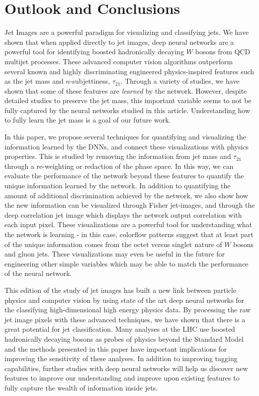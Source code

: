 \section{Outlook and Conclusions}
\label{sec:conclusion}
Jet Images are a powerful paradigm for visualizing and classifying jets.  We have shown that when applied directly to jet images, deep neural networks are a powerful tool for identifying boosted hadronically decaying $W$ bosons from QCD multijet processes.  These advanced computer vision algorithms outperform several known and highly discriminating engineered physics-inspired features such as the jet mass and $n$-subjettiness, $\tau_{21}$.  Through a variety of studies, we have shown that some of these features are {\it learned} by the network.  However, despite detailed studies to preserve the jet mass, this important variable seems to not be fully captured by the neural networks studied in this article.  Understanding how to fully learn the jet mass is a goal of our future work.

In this paper, we propose several techniques for quantifying and visualizing the information learned by the DNNs, and connect these visualizations with physics properties.  This is studied by removing the information from jet mass and $\tau_{21}$ through a re-weighting or redaction of the phase space.  In this way, we can evaluate the performance of the network beyond these features to quantify the unique information learned by the network.  In addition to quantifying the amount of additional discrimination achieved by the network, we also show how the new information can be visualized through Fisher jet-images, and through the deep correlation jet image which displays the network output correlation with each input pixel.  These visualizations are a powerful tool for understanding what the network is learning - in this case, colorflow patterns suggest that at least part of the unique information comes from the octet versus singlet nature of $W$ bosons and gluon jets.  These visualizations may even be useful in the future for engineering other simple variables which may be able to match the performance of the neural network.  

This edition of the study of jet images has built a new link between particle physics and computer vision by using state of the art deep neural networks for the classifying high-dimensional high energy physics data.  By processing the raw jet image pixels with these advanced techniques, we have shown that there is a great potential for jet classification.  Many analyses at the LHC use boosted hadronically decaying bosons as probes of physics beyond the Standard Model and the methods presented in this paper have important implications for improving the sensitivity of these analyses.  In addition to improving tagging capabilities, further studies with deep neural networks will help us discover new features to improve our understanding and improve upon existing features to fully capture the wealth of information inside jets.